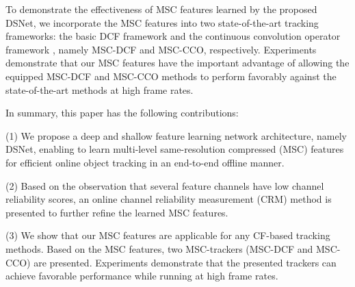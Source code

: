 \documentclass[runningheads]{llncs}
\begin{document}



To demonstrate the effectiveness of MSC features learned by the proposed DSNet, we incorporate the MSC features into two state-of-the-art tracking frameworks: the basic DCF framework \cite{KCF} and the continuous convolution operator framework \cite{CCOT}, namely MSC-DCF and MSC-CCO, respectively. Experiments demonstrate that our MSC features have the important advantage of allowing the equipped MSC-DCF and MSC-CCO methods to perform favorably against the state-of-the-art methods at high frame rates.


In summary, this paper has the following contributions:

(1) We propose a deep and shallow feature learning network architecture, namely DSNet, enabling to learn multi-level same-resolution compressed (MSC) features for efficient online object tracking in an end-to-end offline manner.

(2) Based on the observation that several feature channels have low channel reliability scores, an online channel reliability measurement (CRM) method is presented to further refine the learned MSC features.


(3) We show that our MSC features are applicable for any CF-based tracking methods. Based on the MSC features, two MSC-trackers (MSC-DCF and MSC-CCO) are presented. Experiments demonstrate that the presented trackers can achieve favorable performance while running at high frame rates. 
\end{document}
